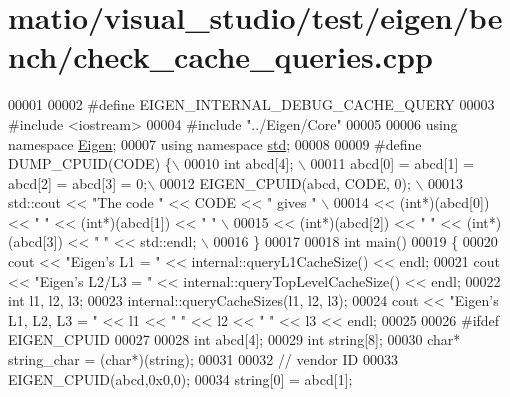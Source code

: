 \hypertarget{matio_2visual__studio_2test_2eigen_2bench_2check__cache__queries_8cpp_source}{}\section{matio/visual\+\_\+studio/test/eigen/bench/check\+\_\+cache\+\_\+queries.cpp}
\label{matio_2visual__studio_2test_2eigen_2bench_2check__cache__queries_8cpp_source}

\begin{DoxyCode}
00001 
00002 \textcolor{preprocessor}{#define EIGEN\_INTERNAL\_DEBUG\_CACHE\_QUERY}
00003 \textcolor{preprocessor}{#include <iostream>}
00004 \textcolor{preprocessor}{#include "../Eigen/Core"}
00005 
00006 \textcolor{keyword}{using namespace }\hyperlink{namespace_eigen}{Eigen};
00007 \textcolor{keyword}{using namespace }\hyperlink{namespacestd}{std};
00008 
00009 \textcolor{preprocessor}{#define DUMP\_CPUID(CODE) \{\(\backslash\)}
00010 \textcolor{preprocessor}{  int abcd[4]; \(\backslash\)}
00011 \textcolor{preprocessor}{  abcd[0] = abcd[1] = abcd[2] = abcd[3] = 0;\(\backslash\)}
00012 \textcolor{preprocessor}{  EIGEN\_CPUID(abcd, CODE, 0); \(\backslash\)}
00013 \textcolor{preprocessor}{  std::cout << "The code " << CODE << " gives " \(\backslash\)}
00014 \textcolor{preprocessor}{              << (int*)(abcd[0]) << " " << (int*)(abcd[1]) << " " \(\backslash\)}
00015 \textcolor{preprocessor}{              << (int*)(abcd[2]) << " " << (int*)(abcd[3]) << " " << std::endl; \(\backslash\)}
00016 \textcolor{preprocessor}{  \}}
00017   
00018 \textcolor{keywordtype}{int} main()
00019 \{
00020   cout << \textcolor{stringliteral}{"Eigen's L1    = "} << internal::queryL1CacheSize() << endl;
00021   cout << \textcolor{stringliteral}{"Eigen's L2/L3 = "} << internal::queryTopLevelCacheSize() << endl;
00022   \textcolor{keywordtype}{int} l1, l2, l3;
00023   internal::queryCacheSizes(l1, l2, l3);
00024   cout << \textcolor{stringliteral}{"Eigen's L1, L2, L3       = "} << l1 << \textcolor{stringliteral}{" "} << l2 << \textcolor{stringliteral}{" "} << l3 << endl;
00025   
00026 \textcolor{preprocessor}{  #ifdef EIGEN\_CPUID}
00027 
00028   \textcolor{keywordtype}{int} abcd[4];
00029   \textcolor{keywordtype}{int} \textcolor{keywordtype}{string}[8];
00030   \textcolor{keywordtype}{char}* string\_char = (\textcolor{keywordtype}{char}*)(\textcolor{keywordtype}{string});
00031 
00032   \textcolor{comment}{// vendor ID}
00033   EIGEN\_CPUID(abcd,0x0,0);
00034   \textcolor{keywordtype}{string}[0] = abcd[1];

\end{DoxyCode}
